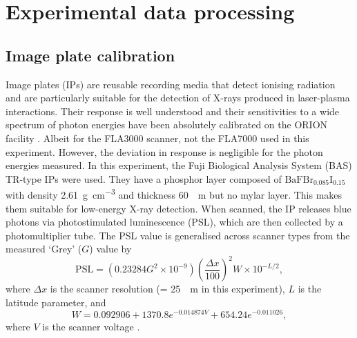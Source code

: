 \section{\label{ch:3-sec:data_processing}Experimental data processing}
\subsection{Image plate calibration}
Image plates (IPs) are reusable recording media that detect ionising radiation and are particularly suitable for the detection of X-rays produced in laser-plasma interactions. Their response is well understood and their sensitivities to a wide spectrum of photon energies have been absolutely calibrated on the ORION facility \cite{meadowcroftEvaluationSensitivityFading2008}. Albeit for the FLA3000 scanner, not the FLA7000 used in this experiment. However, the deviation in response is negligible for the photon energies measured. In this experiment, the Fuji Biological Analysis System (BAS) TR-type IPs were used. They have a phosphor layer composed of $\mathrm{BaFBr_{0.085}I_{0.15}}$ with density \qty{2.61}{g.cm^{-3}} and thickness \qty{60}{\mu m} but no mylar layer. This makes them suitable for low-energy X-ray detection. When scanned, the IP releases blue photons via photostimulated luminescence (PSL), which are then collected by a photomultiplier tube. The PSL value is generalised across scanner types from the measured `Grey' ($G$) value by
\begin{equation}
	\mathrm{PSL} = (0.23284G^2\times 10^{-9})\left(\frac{\Delta x}{100}\right)^2W\times 10^{-L/2},
\end{equation}
where $\Delta x$ is the scanner resolution (= \qty{25}{\mu m} in this experiment), $L$ is the latitude parameter, and
\begin{equation}
	W = 0.092906 + 1370.8e^{-0.014874V} +  654.24e^{-0.011026},
\end{equation}
where $V$ is the scanner voltage \cite{golovinCalibrationImagingPlates2021}.

